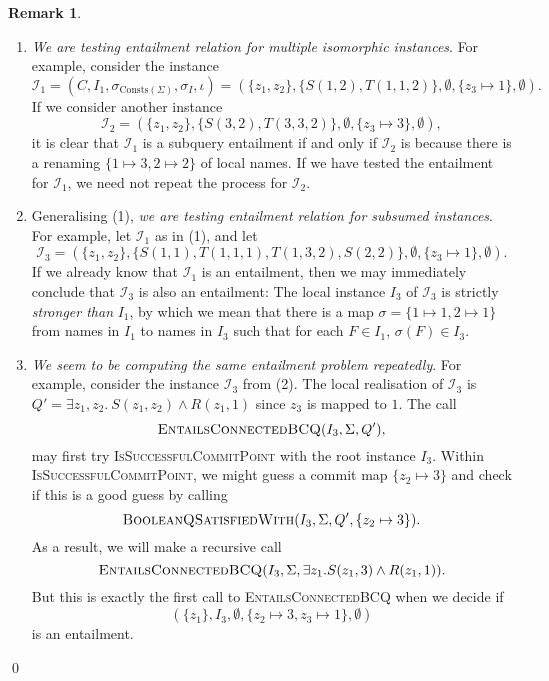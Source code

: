 \documentclass[12pt]{report}
\theoremstyle{plain}
\theoremstyle{definition}
\newtheorem{remark}[theorem]{Remark}
\def\Consts{{\mathrm{Consts}}}
\begin{document}
\begin{remark}
  \begin{enumerate}
    \item \textit{We are testing entailment relation for multiple isomorphic instances}. For example, consider the instance $$
      \mathcal{I}_1 = (C, I_1, \sigma_{\Consts(\Sigma)}, \sigma_I, \iota) = (\{z_1, z_2\}, \{ S(1, 2), T(1, 1, 2) \}, \emptyset, \{ z_3 \mapsto 1 \}, \emptyset).
    $$ If we consider another instance $$
      \mathcal{I}_2 = (\{z_1, z_2\}, \{ S(3, 2), T(3, 3, 2) \}, \emptyset, \{ z_3 \mapsto 3 \}, \emptyset),
    $$ it is clear that $\mathcal{I}_1$ is a subquery entailment if and only if $\mathcal{I}_2$ is because there is a renaming $\{ 1 \mapsto 3, 2 \mapsto 2 \}$ of local names. If we have tested the entailment for $\mathcal{I}_1$, we need not repeat the process for $\mathcal{I}_2$.
    \item Generalising (1), \textit{we are testing entailment relation for subsumed instances}. For example, let $\mathcal{I}_1$ as in (1), and let $$
      \mathcal{I}_3 = (\{z_1, z_2\}, \{ S(1, 1), T(1, 1, 1), T(1, 3, 2), S(2, 2) \}, \emptyset, \{ z_3 \mapsto 1 \}, \emptyset).
    $$ If we already know that $\mathcal{I}_1$ is an entailment, then we may immediately conclude that $\mathcal{I}_3$ is also an entailment: The local instance $I_3$ of $\mathcal{I}_3$ is strictly \emph{stronger than} $I_1$, by which we mean that there is a map $\sigma = \{1 \mapsto 1, 2 \mapsto 1\}$ from names in $I_1$ to names in $I_3$ such that for each $F \in I_1$, $\sigma(F) \in I_3$.
    \item \textit{We seem to be computing the same entailment problem repeatedly}. For example, consider the instance $\mathcal{I}_3$ from (2). The local realisation of $\mathcal{I}_3$ is $Q' = \exists z_1, z_2.\ S(z_1, z_2) \wedge R(z_1, 1)$ since $z_3$ is mapped to $1$. The call
    $$\textsc{EntailsConnectedBCQ}(I_3, \Sigma, Q'),$$ may first try \textsc{IsSuccessfulCommitPoint} with the root instance $I_3$. Within \textsc{IsSuccessfulCommitPoint}, we might guess a commit map $\{ z_2 \mapsto 3 \}$ and check if this is a good guess by calling 
    $$\textsc{BooleanQSatisfiedWith}(I_3, \Sigma, Q', \{ z_2 \mapsto 3 \}).$$
    As a result, we will make a recursive call
    $$\textsc{EntailsConnectedBCQ}(I_3, \Sigma, \exists z_1. S(z_1, 3) \wedge R(z_1, 1)).$$ But this is exactly the first call to \textsc{EntailsConnectedBCQ} when we decide if $$(\{z_1\}, I_3, \emptyset, \{ z_2 \mapsto 3, z_3 \mapsto 1 \}, \emptyset)$$ is an entailment.
  \end{enumerate}
  \qed
\end{remark}
\end{document}
